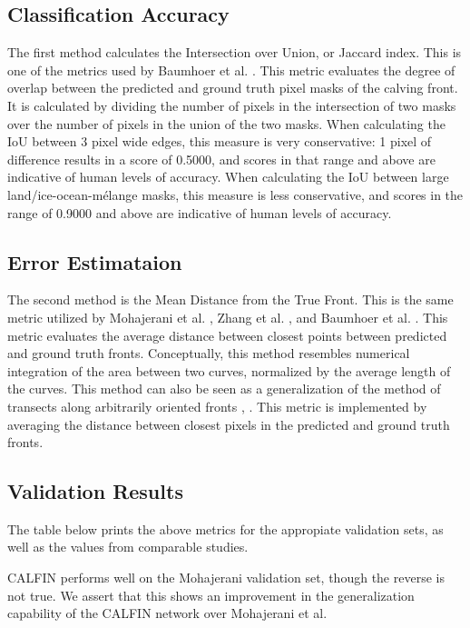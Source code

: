 \documentclass[tc, manuscript]{copernicus}
\begin{document}
\subsection{Classification Accuracy}
The first method calculates the Intersection over Union, or Jaccard index. This is one of the metrics used by Baumhoer et al. \citep{baumhoer2019}. This metric evaluates the degree of overlap between the predicted and ground truth pixel masks of the calving front. It is calculated by dividing the number of pixels in the intersection of two masks over the number of pixels in the union of the two masks. When calculating the IoU between 3 pixel wide edges, this measure is very conservative: 1 pixel of difference results in a score of 0.5000, and scores in that range and above are indicative of human levels of accuracy. When calculating the IoU between large land/ice-ocean-mélange masks, this measure is less conservative, and scores in the range of 0.9000 and above are indicative of human levels of accuracy.


\subsection{Error Estimataion}
The second method is the Mean Distance from the True Front. This is the same metric utilized by Mohajerani et al. \citep{mohajerani2019}, Zhang et al. \citep{zhang2019}, and Baumhoer et al. \citep{baumhoer2019}. This metric evaluates the average distance between closest points between predicted and ground truth fronts. Conceptually, this method resembles numerical integration of the area between two curves, normalized by the average length of the curves. This method can also be seen as a generalization of the method of transects along arbitrarily oriented fronts \citep{mohajerani2019}, \citep{baumhoer2019}. This metric is implemented by averaging the distance between closest pixels in the predicted and ground truth fronts.


\subsection{Validation Results}
The table below prints the above metrics for the appropiate validation sets, as well as the values from comparable studies. 

CALFIN performs well on the Mohajerani validation set, though the reverse is not true. We assert that this shows an improvement in the generalization capability of the CALFIN network over Mohajerani et al. 
\end{document}
